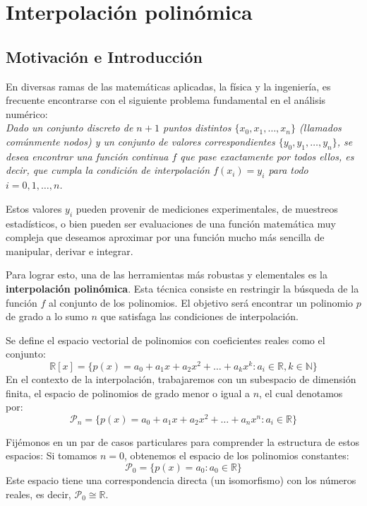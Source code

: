 \section{Interpolación polinómica}

\subsection{Motivación e Introducción}

En diversas ramas de las matemáticas aplicadas, la física y la ingeniería, es frecuente encontrarse con el siguiente problema fundamental en el análisis numérico:\\

\textit{Dado un conjunto discreto de $n+1$ puntos distintos $\{x_0, x_1, \ldots, x_n\}$ (llamados comúnmente nodos) y un conjunto de valores correspondientes $\{y_0, y_1, \ldots, y_n\}$, se desea encontrar una función continua $f$ que pase exactamente por todos ellos, es decir, que cumpla la condición de interpolación $f(x_i) = y_i$ para todo $i = 0, 1, \ldots, n$.}

Estos valores $y_i$ pueden provenir de mediciones experimentales, de muestreos estadísticos, o bien pueden ser evaluaciones de una función matemática muy compleja que deseamos aproximar por una función mucho más sencilla de manipular, derivar e integrar. 

Para lograr esto, una de las herramientas más robustas y elementales es la \textbf{interpolación polinómica}. Esta técnica consiste en restringir la búsqueda de la función $f$ al conjunto de los polinomios. El objetivo será encontrar un polinomio $p$ de grado a lo sumo $n$ que satisfaga las condiciones de interpolación. 

\begin{definición}
    Se define el espacio vectorial de polinomios con coeficientes reales como el conjunto:
    \[
        \mathbb{R}[x] = \{ p(x) = a_0 + a_1 x + a_2 x^2 + \ldots + a_k x^k : a_i \in \mathbb{R}, k \in \mathbb{N} \}
    \]
    En el contexto de la interpolación, trabajaremos con un subespacio de dimensión finita, el espacio de polinomios de grado menor o igual a $n$, el cual denotamos por:
    \[
        \mathcal{P}_n = \{ p(x) = a_0 + a_1 x + a_2 x^2 + \ldots + a_n x^n : a_i \in \mathbb{R} \}
    \]
\end{definición}

Fijémonos en un par de casos particulares para comprender la estructura de estos espacios:
Si tomamos $n=0$, obtenemos el espacio de los polinomios constantes:
\[
    \mathcal{P}_0 = \{ p(x) = a_0 : a_0 \in \mathbb{R} \}
\]
Este espacio tiene una correspondencia directa (un isomorfismo) con los números reales, es decir, $\mathcal{P}_0 \cong \mathbb{R}$.

